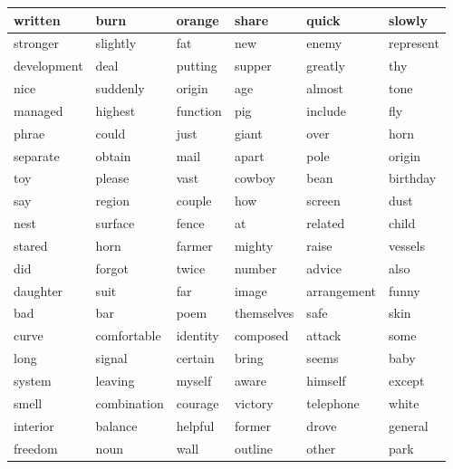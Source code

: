 \documentclass{jcls}
\begin{document}
\begin{fullwidth}
	\begin{longtable}{@{}llllll@{}}
		written     & burn        & orange   & share      & quick       & slowly    \\* \midrule
		\endhead
		\endfoot
		\endlastfoot
		stronger    & slightly    & fat      & new        & enemy       & represent \\
		development & deal        & putting  & supper     & greatly     & thy       \\
		nice        & suddenly    & origin   & age        & almost      & tone      \\
		managed     & highest     & function & pig        & include     & fly       \\
		phrae       & could       & just     & giant      & over        & horn      \\
		separate    & obtain      & mail     & apart      & pole        & origin    \\
		toy         & please      & vast     & cowboy     & bean        & birthday  \\
		say         & region      & couple   & how        & screen      & dust      \\
		nest        & surface     & fence    & at         & related     & child     \\
		stared      & horn        & farmer   & mighty     & raise       & vessels   \\
		did         & forgot      & twice    & number     & advice      & also      \\
		daughter    & suit        & far      & image      & arrangement & funny     \\
		bad         & bar         & poem     & themselves & safe        & skin      \\
		curve       & comfortable & identity & composed   & attack      & some      \\
		long        & signal      & certain  & bring      & seems       & baby      \\
		system      & leaving     & myself   & aware      & himself     & except    \\
		smell       & combination & courage  & victory    & telephone   & white     \\
		interior    & balance     & helpful  & former     & drove       & general   \\
		freedom     & noun        & wall     & outline    & other       & park      \\

\end{longtable}
\end{fullwidth}
\end{document}
